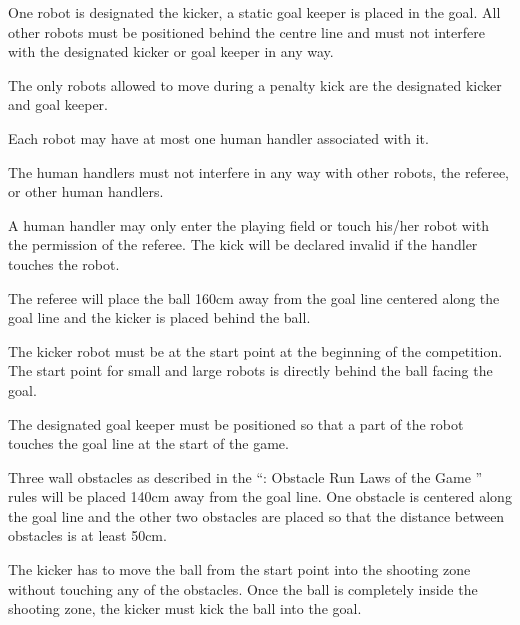 \documentclass[12pt]{hurocup}
\begin{document}
\begin{lawlist}[PK]

\item One robot is designated the kicker, a static goal keeper is
  placed in the goal. All other robots must be positioned behind the
  centre line and must not interfere with the designated kicker or
  goal keeper in any way.

\item The only robots allowed to move during a penalty kick are the
  designated kicker and goal keeper.

\item Each robot may have at most one human handler associated with
  it. 

\item \label{rd-handler1} The human handlers must not interfere in any
  way with other robots, the referee, or other human handlers.

\item \label{rd-handler2} A human handler may only enter the playing
  field or touch his/her robot with the permission of the referee.
  The kick will be declared invalid if the handler touches the robot.

\item The referee will place the ball 160cm away from the goal line
  centered along the goal line and the kicker is placed behind the
  ball.

\item The kicker robot must be at the start point at the beginning of
  the competition. The start point for small and large robots is directly 
behind the ball facing the goal.

\item The designated goal keeper must be positioned so that a part of
 the robot touches the goal line at the start of the game.

\item Three wall obstacles as described in the ``\HuroCup: Obstacle
  Run Laws of the Game \thisyear'' rules will be placed 140cm away
  from the goal line. One obstacle is centered along the goal line and
  the other two obstacles are placed so that the distance between
  obstacles is at least 50cm.

\item The kicker has to move the ball from the start point into the
  shooting zone without touching any of the obstacles. Once the ball
  is completely inside the shooting zone, the kicker must kick the
  ball into the goal.


\end{lawlist}
\end{document}
